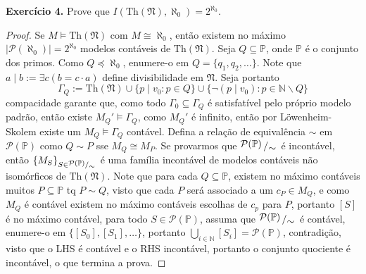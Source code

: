 \documentclass[11pt]{article}
\newcommand{\mc}[1]{\mathcal{#1}}
\newcommand{\mf}[1]{\mathfrak{#1}}
\newcommand{\mbb}[1]{\mathbb{#1}}
\newcommand{\bigslant}[2]{{\raisebox{.2em}{$#1$}\left/\raisebox{-.2em}{$#2$}\right.}}
\begin{document}
\begin{shaded}
\textbf{Exercício 4.} Prove que $I(\text{Th}(\mf{N}),\aleph_0)=2^{\aleph_0}$.
\end{shaded}

\begin{proof}
    Se $M\vDash\text{Th}(\mf{N})$ com $M\cong\aleph_0$, então existem no máximo $|\mc{P}(\aleph_0)|=2^{\aleph_0}$ modelos contáveis de $\text{Th}(\mf{N})$. Seja $Q\subseteq\mbb{P}$, onde $\mbb{P}$ é o conjunto dos primos. Como $Q\preceq\aleph_0$, enumere-o em $Q=\{q_1,q_2,\dots\}$. Note que $a\mid b:=\exists c(b=c\cdot a)$ define divisibilidade em $\mf{N}$. Seja portanto
    $$\Gamma_Q:=\text{Th}(\mf{N})\cup\{p\mid v_0: p\in Q\}\cup\{\neg(p\mid v_0): p\in\mbb{N}\backslash Q\}$$
    compacidade garante que, como todo $\Gamma_0\subseteq\Gamma_Q$ é satisfatível pelo próprio modelo padrão, então existe $M_Q'\vDash\Gamma_Q$, como $M_Q'$ é infinito, então por Löwenheim-Skolem existe um $M_Q\vDash\Gamma_Q$ contável. Defina a relação de equivalência $\sim$ em $\mc{P}(\mbb{P})$ como $Q\sim P$ sse $M_Q\cong M_P$. Se provarmos que $\bigslant{\mc{P}(\mbb{P})}{\sim}$ é incontável, então $\{M_S\}_{S\in\scriptsize{\bigslant{\mc{P}(\mbb{P})}{\sim}}}$ é uma família incontável de modelos contáveis não isomórficos de $\text{Th}(\mf{N})$. Note que para cada $Q\subseteq\mbb{P}$, existem no máximo contáveis muitos $P\subseteq\mbb{P}$ tq $P\sim Q$, visto que cada $P$ será associado a um $c_P\in M_Q$, e como $M_Q$ é contável existem no máximo contáveis escolhas de $c_p$ para $P$, portanto $[S]$ é no máximo contável, para todo $S\in\mc{P}(\mbb{P})$, assuma que $\bigslant{\mc{P}(\mbb{P})}{\sim}$ é contável, enumere-o em $\{[S_0],[S_1],\dots\}$, portanto $\bigcup_{i\in\mbb{N}}[S_i]=\mc{P}(\mbb{P})$, contradição, visto que o LHS é contável e o RHS incontável, portanto o conjunto quociente é incontável, o que termina a prova.
\end{proof}
\end{document}

